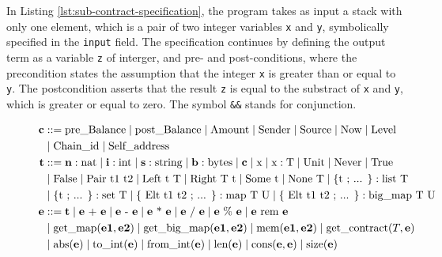 \documentclass[runningheads]{llncs}
\begin{document}
In Listing \ref{lst:sub-contract-specification}, the program takes as input a stack with only one
element, which is a pair of two integer variables \lstinline/x/ and \lstinline/y/, symbolically specified in the \lstinline|input| field. 
The specification continues by defining the output term as a variable \lstinline/z/ of interger, and 
pre- and post-conditions, where the precondition states the assumption
that the integer \lstinline/x/ is greater than or equal to  \lstinline/y/. The postcondition asserts that the result
\lstinline/z/ is equal to the substract of
\lstinline/x/ and \lstinline/y/, which is greater or equal to
zero. The symbol \lstinline/&&/ stands for conjunction. 
\begin{figure}[tp]
\begin{align*}
\textbf{c} & ::= 
    \text{pre\_Balance}
   \Mid \text{post\_Balance}
   \Mid \text{Amount}
   \Mid \text{Sender}
   \Mid \text{Source} 
   \Mid \text{Now}
   \Mid \text{Level} \\
   &\Mid \text{Chain\_id}
   \Mid \text{Self\_address}\\
\textbf{t} &::= 
   \textbf{n}: \text{nat}
   \Mid \textbf{i}: \text{int}
   \Mid  \textbf{s}: \text{string} 
   \Mid  \textbf{b}: \text{bytes}
   \Mid  \textbf{c}  
   \Mid  \text{x} 
   \Mid \text{x}: \text{T} 
   \Mid \UNIT 
   \Mid \NEVER 
   \Mid \TRUE \\
   &\Mid \FALSE 
   \Mid \PAIR\ \text{t1 t2}
   \Mid \LEFT\ \text{t}\  \text{T}
   \Mid \RIGHT\ \text{T}\ \text{t}
   \Mid \SOME\ \text{t}
   \Mid \NONE\ \text{T} 
   \Mid \text{\{t ; ... \}}: \text{list T} \\
   &\Mid \text{\{t ; ... \}}: \text{set T} 
   \Mid \text{\{ Elt t1 t2 ; ... \}}: \text{map T U}
   \Mid \text{\{ Elt t1 t2 ; ... \}}: \text{big\_map T U} \\
\textbf{e} & :: = \textbf{t}  \Mid \textbf{e} \text{ + } \textbf{e}\Mid \textbf{e} \text{ - } \textbf{e}  \Mid \textbf{e} \text{ * } \textbf{e} \Mid \textbf{e} \text{ / } \textbf{e} \Mid \textbf{e} \text{ \% } \textbf{e} \Mid \textbf{e} \text{ rem } \textbf{e} \\
& 
 \Mid \text{get\_map} (\textbf{e1}, \textbf{e2}) 
 \Mid \text{get\_big\_map} (\textbf{e1}, \textbf{e2})  
 \Mid \text{mem} (\textbf{e1}, \textbf{e2})  
 \Mid \text{get\_contract} (T, \textbf{e})    \\
& \Mid \text{abs} (\textbf{e})  
 \Mid \text{to\_int} (\textbf{e})  
 \Mid \text{from\_int} (\textbf{e})  
 \Mid \text{len} (\textbf{e})
 \Mid \text{cons} (\textbf{e}, \textbf{e})
 \Mid \text{size} (\textbf{e})

\end{align*}
\end{figure}
\end{document}
